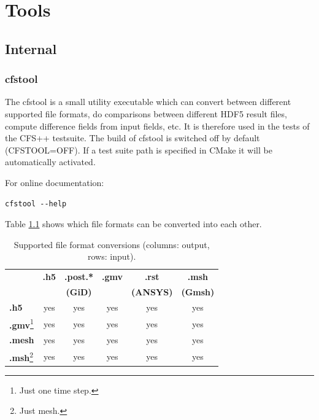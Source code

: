 \chapter{Tools}

\section{Internal}

\subsection{cfstool}
\label{sec:cfs_tool}

The cfstool is a small  utility executable which can convert between different
supported file  formats, do comparisons  between different HDF5  result files,
compute difference fields from input fields,  etc. It is therefore used in the
tests of the CFS++ testsuite. The  build of cfstool is switched off by default
(CFSTOOL=OFF).  If  a  test suite  path  is  specified  in  CMake it  will  be
automatically activated.

\noindent For online documentation:
\begin{verbatim}
cfstool --help
\end{verbatim}

\noindent Table \ref{tab:cfstool_conversions} shows  which file formats can be
converted into each other.

\begin{table}[htb]
\centering
\begin{minipage}{18cc}\caption{Supported file format conversions (columns: output, rows: input).}
\label{tab:cfstool_conversions}
\end{minipage}
\par\medskip\noindent
\begin{minipage}{18cc}
\centering
\begin{tabular}{lccccc}
  \toprule
            & {\bf .h5} & {\bf .post.* } & {\bf .gmv} & {\bf .rst}    & {\bf .msh}   \\ %
            &           & {\bf (GiD)}    &            & {\bf (ANSYS)} & {\bf (Gmsh)} \\ \otoprule %
  {\bf .h5} & yes & yes & yes & yes & yes \\
  {\bf .gmv}\footnote{Just one time step.} & yes & yes & yes & yes & yes  \\
  {\bf .mesh} & yes & yes & yes & yes & yes \\
  {\bf .msh}\footnote{Just mesh.} & yes & yes & yes & yes & yes \\
  \bottomrule
\end{tabular} 
\end{minipage}
\end{table}

